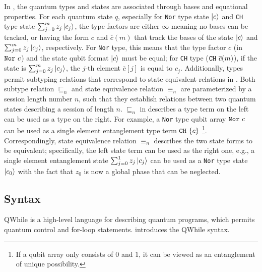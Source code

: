 In \qafny, the quantum types and states are associated through bases and equational properties.
For each quantum state $q$, especially for \texttt{Nor} type state $\left\vert{c}\right\rangle$ and \texttt{CH} type state $\sum_{j=0}^{m}{z_j\left\vert{c_j}\right\rangle}$, the type factors are either $\infty$ meaning no bases can be tracked, or having the form $c$ and $\overline{c}(m)$ that track the bases of the state $\left\vert{c}\right\rangle$ and $\sum_{j=0}^{m}{z_j\left\vert{c_j}\right\rangle}$, respectively. For \texttt{Nor} type, this means that the type factor $c$ (in $\texttt{Nor}~{c}$) and the state qubit format $\left\vert{c}\right\rangle$ must be equal; for \texttt{CH} type ($\texttt{CH}~{\overline{c}(m)}$), if the state is $\sum_{j=0}^{m}{z_j\left\vert{c_j}\right\rangle}$, the $j$-th element $\overline{c}[j]$ is equal to $c_j$.
Additionally, \qafny types permit subtyping relations that correspond to state equivalent relations in . 
Both subtype relation $\sqsubseteq_n$ and state equivalence relation $\equiv_n$ are parameterized by a session length number $n$, such that they establish relations between two quantum states describing a session of length $n$.
$\sqsubseteq_n$ in  describes a type term on the left can be used as a type on the right. For example, a \texttt{Nor} type qubit array $\texttt{Nor}~{c}$ can be used as a single element entanglement type term $\texttt{CH}~{\{c\}}$ \footnote{If a qubit array only consists of $0$ and $1$, it can be viewed as an entanglement of unique possibility. }. 
Correspondingly, state equivalence relation $\equiv_n$ describes the two state forms to be equivalent; specifically, the left state term can be used as the right one, e.g., a single element entanglement state $\sum_{j=0}^{1}{z_j\left\vert{c_j}\right\rangle}$ can be used as a \texttt{Nor} type state $\left\vert{c_0}\right\rangle$ with the fact that $z_0$ is now a global phase that can be neglected.

\subsection{Syntax}
\sloppy
QWhile is a high-level language for describing quantum programs,
which permits quantum control and for-loop statements.
 introduces the QWhile syntax. 

